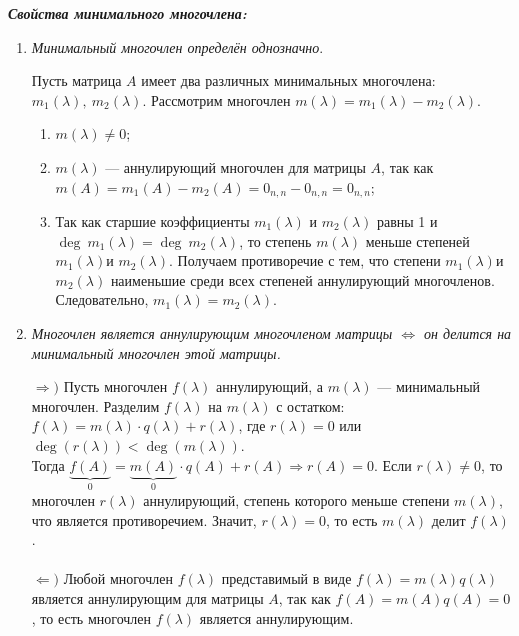 \textit{\textbf{Свойства минимального многочлена:}}\begin{enumerate}
	\item \textit{Минимальный многочлен определён однозначно}.\begin{Proof}
		Пусть матрица $A$ имеет два различных минимальных многочлена: $m_1(\lambda),\ m_2(\lambda)$. Рассмотрим многочлен $m(\lambda) = m_1(\lambda) - m_2(\lambda)$.\begin{enumerate}
			\item $m(\lambda) \ne 0$;
			\item $m(\lambda)$ --- аннулирующий многочлен для матрицы $A$, так как $m(A) = m_1(A) - m_2(A) = 0_{n,n} - 0_{n,n} = 0_{n,n}$;
			\item Так как старшие коэффициенты $m_1(\lambda)$ и $m_2(\lambda)$ равны 1 и $\deg \ m_1(\lambda) = \deg \ m_2(\lambda)$, то степень $m(\lambda)$ меньше степеней $m_1(\lambda)$и $m_2(\lambda)$. Получаем противоречие с тем, что степени $m_1(\lambda)$и $m_2(\lambda)$ наименьшие среди всех степеней аннулирующий многочленов. Следовательно, $m_1(\lambda)=m_2(\lambda)$.
		\end{enumerate} 
	\end{Proof}
	\item \textit{Многочлен является аннулирующим многочленом матрицы $\Longleftrightarrow$ он
		делится на минимальный многочлен этой матрицы.}\begin{Proof}
		$\Rightarrow)$ Пусть многочлен $f(\lambda) $ аннулирующий, а $m(\lambda)$ --- минимальный многочлен. Разделим $f(\lambda)$ на $m(\lambda)$ с остатком:\\
		$f(\lambda) = m(\lambda) \cdot q(\lambda) + r(\lambda)$, где $r(\lambda) = 0$ или $\deg  (r(\lambda)) < \deg  (m(\lambda))$.\\
		Тогда $\underbrace{f(A)}_{0} = \underbrace{m(A)}_{0} \cdot q(A) + r(A) \Rightarrow r(A) = 0$. Если $r(\lambda) \ne 0$, то многочлен $r(\lambda)$ аннулирующий, степень которого меньше степени $m(\lambda)$, что является противоречием. Значит, $r(\lambda) = 0$, то есть $m(\lambda)$ делит $f(\lambda)$.\\\\
		$\Leftarrow)$ Любой многочлен $f(\lambda)$ представимый в виде $f(\lambda)=m(\lambda)q(\lambda)$ является аннулирующим для матрицы $A$, так как $f(A) = m(A)q(A) = 0$, то есть многочлен $f(\lambda)$ является аннулирующим.
	\end{Proof}
\end{enumerate}
